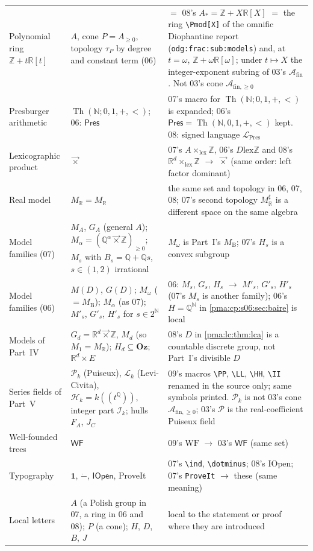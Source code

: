 \documentclass[11pt]{article}
\numberwithin{equation}{section}
\theoremstyle{definition}
\theoremstyle{remark}
\newcommand{\N}{\mathbb N}
\newcommand{\Z}{\mathbb Z}
\newcommand{\Q}{\mathbb Q}
\newcommand{\R}{\mathbb R}
\newcommand{\Oz}{\mathbf{Oz}}
\newcommand{\lex}{\mathbin{\overrightarrow\times}}
\newcommand{\MR}{M_{\R}}
\newcommand{\MB}{M_{\mathrm B}}
\newcommand{\Th}{\operatorname{Th}}
\newcommand{\one}{\mathbf 1}
\newcommand{\monus}{\mathbin{\dot{-}}}
\newcommand{\repo}{\textsf{ProveIt}}
\newcommand{\WF}{\mathsf{WF}}
\newcommand{\IOpen}{\mathsf{IOpen}}
\newcommand{\Pui}{\mathcal P}
\newcommand{\A}{\mathcal A_{\mathrm{fin}}}
\newcommand{\PP}{\mathcal A_{\mathrm{fin},\geq 0}}
\newcommand{\replabel}[1]{\nolinkurl{#1}}
\newcommand{\Pres}{\mathsf{Pres}}
\newcommand{\pres}{\mathcal L_{\mathrm{Pres}}}
\newcommand{\Pk}{\mathcal P_k}
\newcommand{\Lk}{\mathcal L_k}
\newcommand{\Hk}{\mathcal H_k}
\newcommand{\Ik}{\mathcal I_k}
\begin{document}
\begin{center}
\begin{longtable}{@{}P{.27\textwidth}P{.30\textwidth}P{.37\textwidth}@{}}
Polynomial ring $\Z+t\R[t]$ & $A$, cone $P=A_{\ge0}$, topology $\tau_P$ by degree and constant term (06) & $=$ 08's $A_*=\Z+X\R[X]$ $=$ the ring \texttt{\textbackslash Pmod[X]} of the omnific Diophantine report (\replabel{odg:frac:sub:models}) and, at $t=\omega$, $\Z+\omega\R[\omega]$; under $t\mapsto X$ the integer-exponent subring of 03's $\A$. Not 03's cone $\PP$\\
Presburger arithmetic & $\Th(\N;0,1,+,<)$; 06: $\Pres$ & 07's macro for $\Th(\N;0,1,+,<)$ is expanded; 06's $\Pres=\Th(\N,0,1,+,<)$ kept. 08: signed language $\pres$\\
Lexicographic product & $\lex$ & 07's $A\times_{\mathrm{lex}}\Z$, 06's $D\mathbin{\mathrm{lex}}\Z$ and 08's $\R^d\times_{\mathrm{lex}}\Z$ $\to$ $\lex$ (same order: left factor dominant)\\
Real model & $M_{\R}=\MR$ & the same set and topology in 06, 07, 08; 07's second topology $M_{\R}^\sharp$ is a different space on the same algebra\\
Model families (07) & $M_A$, $G_A$ (general $A$); $M_\alpha=(\Q^\alpha\lex\Z)_{\ge0}$; $M_s$ with $B_s=\Q+\Q s$, $s\in(1,2)$ irrational & $M_\omega$ is Part~I's $\MB$; 07's $H_s$ is a convex subgroup\\
Model families (06) & $M(D)$, $G(D)$; $M_\omega$ ($=\MB$); $M_\alpha$ (as 07); $M'_s$, $G'_s$, $H'_s$ for $s\in2^{\N}$ & 06: $M_s$, $G_s$, $H_s$ $\to$ $M'_s$, $G'_s$, $H'_s$ (07's $M_s$ is another family); 06's $H=\Q^{\N}$ in \cref{pma:cp:s06:sec:baire} is local\\
Models of Part~IV & $G_d=\R^d\lex\Z$, $M_d$ (so $M_1=\MR$); $H_d\subseteq\Oz$; $\R^d\times E$ & 08's $D$ in \cref{pma:lc:thm:lca} is a countable discrete group, not Part~I's divisible $D$\\
Series fields of Part~V & $\Pk$ (Puiseux), $\Lk$ (Levi-Civita), $\Hk=k((t^{\Q}))$, integer part $\Ik$; hulls $F_A$, $J_C$ & 09's macros \texttt{\textbackslash PP}, \texttt{\textbackslash LL}, \texttt{\textbackslash HH}, \texttt{\textbackslash II} renamed in the source only; same symbols printed. $\Pk$ is not 03's cone $\PP$; 03's $\Pui$ is the real-coefficient Puiseux field\\
Well-founded trees & $\WF$ & 09's $\mathrm{WF}$ $\to$ 03's $\mathsf{WF}$ (same set)\\
Typography & $\one$, $\monus$, $\IOpen$, \repo & 07's \texttt{\textbackslash ind}, \texttt{\textbackslash dotminus}; 08's $\mathrm{IOpen}$; 07's \texttt{ProveIt} $\to$ these (same meaning)\\
Local letters & $A$ (a Polish group in 07, a ring in 06 and 08); $P$ (a cone); $H$, $D$, $B$, $J$ & local to the statement or proof where they are introduced\\
\bottomrule
\end{longtable}
\end{center}
\end{document}
